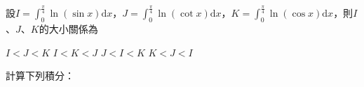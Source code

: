 \documentclass[12pt, addpoints]{exam}
\def \important{\textbf{（重點）}}
\def \hint#1{(\textit{#1})}
\def \d{\mathrm{d}}
\begin{document}
\begin{questions}
\question[1]
設$\displaystyle I=\int_0^{\frac{\pi}{4}} \ln (\sin x) \d x$，$\displaystyle J=\int_0^{\frac{\pi}{4}} \ln (\cot x) \d x$，$\displaystyle K=\int_0^{\frac{\pi}{4}} \ln (\cos x) \d x$，則$I$、$J$、$K$的大小關係為
\begin{choices}
    \choice $I<J<K$
    \choice $I<K<J$
    \choice $J<I<K$
    \choice $K<J<I$
\end{choices}

\newpage %

\question
計算下列積分：
\end{questions}
\end{document}
